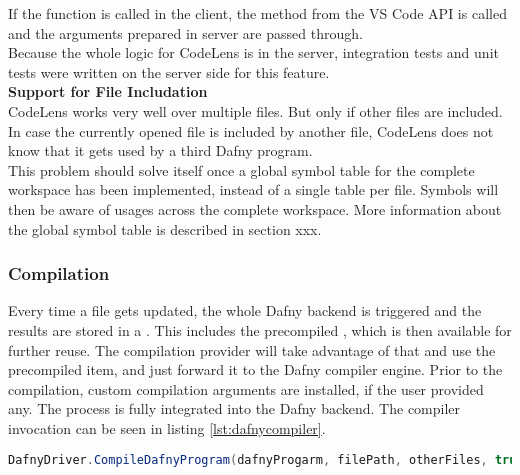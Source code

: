 If the function  is called in the client,
the method  from the VS Code API is called
and the arguments prepared in server are passed through. \\

Because the whole logic for CodeLens is in the server,
integration tests and unit tests were written on the server side for this feature.\\

\textbf{Support for File Includation} \\
CodeLens works very well over multiple files.
But only if other files are included.
In case the currently opened file is included by another file,
CodeLens does not know that it gets used by a third Dafny program. \\

This problem should solve itself once a global symbol table for the complete workspace has been implemented,
instead of a single table per file.
Symbols will then be aware of usages across the complete workspace.
More information about the global symbol table is described in section xxx.


\subsubsection{Compilation}
Every time a file gets updated, the whole Dafny backend is triggered and the results are stored in a .
This includes the precompiled , which is then available for further reuse.
The compilation provider will take advantage of that and use the precompiled item, and just forward it to the Dafny compiler engine.
Prior to the compilation, custom compilation arguments are installed, if the user provided any.
The process is fully integrated into the Dafny backend.
The compiler invocation can be seen in listing \ref{lst:dafnycompiler}.\\

\begin{lstlisting}[language=csharp, caption={Calling the Dafny Compiler}, captionpos=b, label={lst:dafnycompiler}]
DafnyDriver.CompileDafnyProgram(dafnyProgarm, filePath, otherFiles, true, textwriter);
\end{lstlisting}

